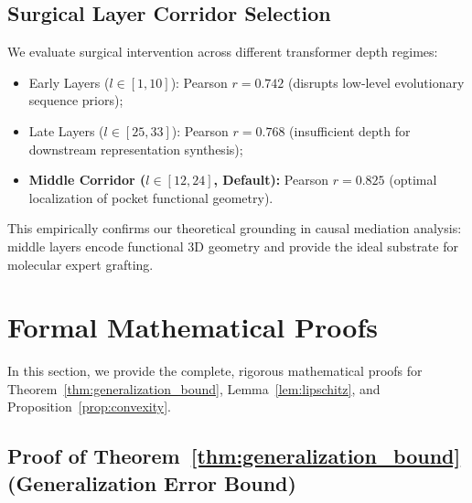 \documentclass{article}
\theoremstyle{definition}
\begin{document}
\subsection{Surgical Layer Corridor Selection}
We evaluate surgical intervention across different transformer depth regimes:
\begin{itemize}[leftmargin=1.5em,noitemsep]
    \item Early Layers ($l \in [1, 10]$): Pearson $r = 0.742$ (disrupts low-level evolutionary sequence priors);
    \item Late Layers ($l \in [25, 33]$): Pearson $r = 0.768$ (insufficient depth for downstream representation synthesis);
    \item \textbf{Middle Corridor ($l \in [12, 24]$, Default):} Pearson $r = 0.825$ (optimal localization of pocket functional geometry).
\end{itemize}
This empirically confirms our theoretical grounding in causal mediation analysis: middle layers encode functional 3D geometry and provide the ideal substrate for molecular expert grafting.



\section{Formal Mathematical Proofs}
\label{sec:proofs}

In this section, we provide the complete, rigorous mathematical proofs for Theorem~\ref{thm:generalization_bound}, Lemma~\ref{lem:lipschitz}, and Proposition~\ref{prop:convexity}.

\subsection{Proof of Theorem~\ref{thm:generalization_bound} (Generalization Error Bound)}
\label{subsec:proof_thm1}
\end{document}
